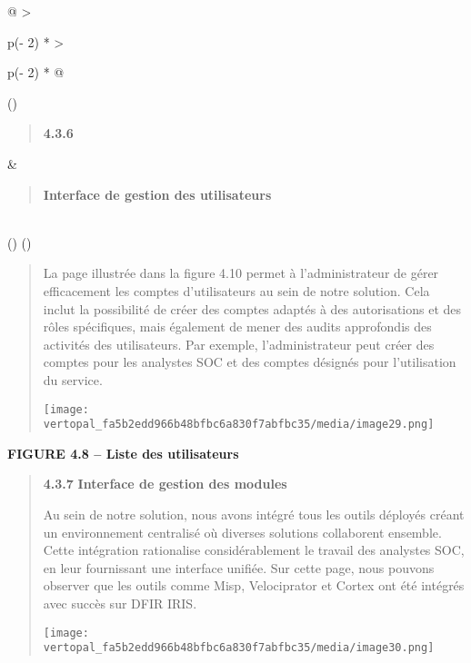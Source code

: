 \documentclass[
]{article}
\begin{document}
\begin{longtable}[]{@{}
  >{\raggedright\arraybackslash}p{(\columnwidth - 2\tabcolsep) * }
  >{\raggedright\arraybackslash}p{(\columnwidth - 2\tabcolsep) * }@{}}
\toprule()
\begin{minipage}[b]{\linewidth}\raggedright
\begin{quote}
\textbf{4.3.6}
\end{quote}
\end{minipage} & \begin{minipage}[b]{\linewidth}\raggedright
\begin{quote}
\textbf{Interface de gestion des utilisateurs}
\end{quote}
\end{minipage} \\
\midrule()
\endhead
\bottomrule()
\end{longtable}

\begin{quote}
La page illustrée dans la figure 4.10 permet à l'administrateur de gérer
efficacement les comptes d'utilisateurs au sein de notre solution. Cela
inclut la possibilité de créer des comptes adaptés à des autorisations
et des rôles spécifiques, mais également de mener des audits approfondis
des activités des utilisateurs. Par exemple, l'administrateur peut créer
des comptes pour les analystes SOC et des comptes désignés pour
l'utilisation du service.

\texttt{[image: vertopal\_fa5b2edd966b48bfbc6a830f7abfbc35/media/image29.png]}
\end{quote}

\textbf{FIGURE 4.8 -- Liste des utilisateurs}

\begin{quote}
\textbf{4.3.7} \textbf{Interface de gestion des modules}

Au sein de notre solution, nous avons intégré tous les outils déployés
créant un environnement centralisé où diverses solutions collaborent
ensemble. Cette intégration rationalise considérablement le travail des
analystes SOC, en leur fournissant une interface unifiée. Sur cette
page, nous pouvons observer que les outils comme Misp, Velociprator et
Cortex ont été intégrés avec succès sur DFIR IRIS.

\texttt{[image: vertopal\_fa5b2edd966b48bfbc6a830f7abfbc35/media/image30.png]}
\end{quote}
\end{document}
